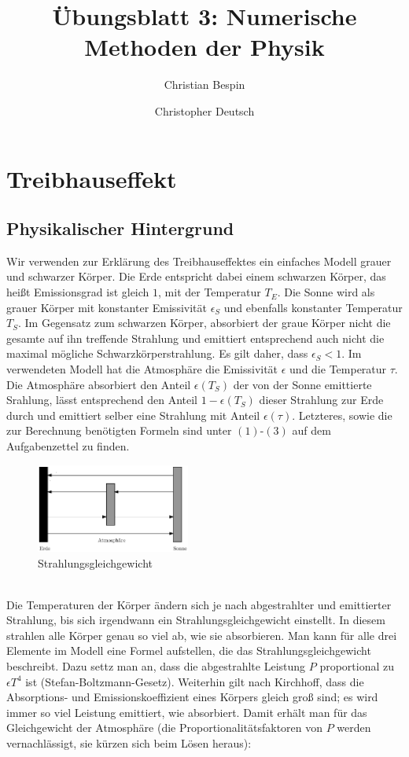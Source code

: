 \documentclass[10pt,a4paper]{article}
\author{Christian Bespin \and Christopher Deutsch}
\title{Übungsblatt 3: Numerische Methoden der Physik}
\begin{document}
\maketitle

\setcounter{section}{1}

\section{Treibhauseffekt}

\subsection{Physikalischer Hintergrund}

Wir verwenden zur Erklärung des Treibhauseffektes ein einfaches Modell grauer und schwarzer Körper. Die Erde entspricht dabei einem schwarzen Körper, das heißt Emissionsgrad ist gleich $1$, mit der Temperatur $T_E$. Die Sonne wird als grauer Körper mit konstanter Emissivität $\epsilon_S$ und ebenfalls konstanter Temperatur $T_S$. Im Gegensatz zum schwarzen Körper, absorbiert der graue Körper nicht die gesamte auf ihn treffende Strahlung und emittiert entsprechend auch nicht die maximal mögliche Schwarzkörperstrahlung. Es gilt daher, dass $\epsilon_{S}<1$. Im verwendeten Modell hat die Atmosphäre die Emissivität $\epsilon$ und die Temperatur $\tau$. Die Atmosphäre absorbiert den Anteil $\epsilon(T_S)$ der von der Sonne emittierte Srahlung, lässt entsprechend den Anteil $1-\epsilon(T_S)$ dieser Strahlung zur Erde durch und emittiert selber eine Strahlung mit Anteil $\epsilon(\tau)$. Letzteres, sowie die zur Berechnung benötigten Formeln sind unter $(1)$-$(3)$ auf dem Aufgabenzettel zu finden.
\begin{figure}
\centering
\includegraphics[width=0.45\textwidth]{./figures/strahlungsgleichgewicht.eps}
\caption{Strahlungsgleichgewicht}
\label{fig:strahlungsgleichgewicht}
\end{figure}
\\
Die Temperaturen der Körper ändern sich je nach abgestrahlter und emittierter Strahlung, bis sich irgendwann ein Strahlungsgleichgewicht einstellt. In diesem strahlen alle Körper genau so viel ab, wie sie absorbieren. Man kann für alle drei Elemente im Modell eine Formel aufstellen, die das Strahlungsgleichgewicht beschreibt. Dazu settz man an, dass die abgestrahlte Leistung $P$ proportional zu $\epsilon T^4$ ist (Stefan-Boltzmann-Gesetz). Weiterhin gilt nach Kirchhoff, dass die Absorptions- und Emissionskoeffizient eines Körpers gleich groß sind; es wird immer so viel Leistung emittiert, wie absorbiert. Damit erhält man für das Gleichgewicht der Atmosphäre (die Proportionalitätsfaktoren von $P$ werden vernachlässigt, sie kürzen sich beim Lösen heraus):
\end{document}

